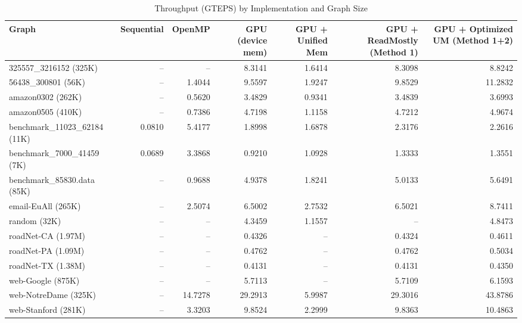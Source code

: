\begin{table}[h]
\centering
\caption{Throughput (GTEPS) by Implementation and Graph Size}
\label{tab:gteps}
\begin{tabular}{lrrrrrr}
\hline
Graph & Sequential & OpenMP & GPU (device mem) & GPU + Unified Mem & GPU + ReadMostly (Method 1) & GPU + Optimized UM (Method 1+2) \\
\hline
325557_3216152 (325K) & -- & -- & 8.3141 & 1.6414 & 8.3098 & 8.8242 \\
56438_300801 (56K) & -- & 1.4044 & 9.5597 & 1.9247 & 9.8529 & 11.2832 \\
amazon0302 (262K) & -- & 0.5620 & 3.4829 & 0.9341 & 3.4839 & 3.6993 \\
amazon0505 (410K) & -- & 0.7386 & 4.7198 & 1.1158 & 4.7212 & 4.9674 \\
benchmark_11023_62184 (11K) & 0.0810 & 5.4177 & 1.8998 & 1.6878 & 2.3176 & 2.2616 \\
benchmark_7000_41459 (7K) & 0.0689 & 3.3868 & 0.9210 & 1.0928 & 1.3333 & 1.3551 \\
benchmark_85830.data (85K) & -- & 0.9688 & 4.9378 & 1.8241 & 5.0133 & 5.6491 \\
email-EuAll (265K) & -- & 2.5074 & 6.5002 & 2.7532 & 6.5021 & 8.7411 \\
random (32K) & -- & -- & 4.3459 & 1.1557 & -- & 4.8473 \\
roadNet-CA (1.97M) & -- & -- & 0.4326 & -- & 0.4324 & 0.4611 \\
roadNet-PA (1.09M) & -- & -- & 0.4762 & -- & 0.4762 & 0.5034 \\
roadNet-TX (1.38M) & -- & -- & 0.4131 & -- & 0.4131 & 0.4350 \\
web-Google (875K) & -- & -- & 5.7113 & -- & 5.7109 & 6.1593 \\
web-NotreDame (325K) & -- & 14.7278 & 29.2913 & 5.9987 & 29.3016 & 43.8786 \\
web-Stanford (281K) & -- & 3.3203 & 9.8524 & 2.2999 & 9.8363 & 10.4863 \\
\hline
\end{tabular}
\end{table}
